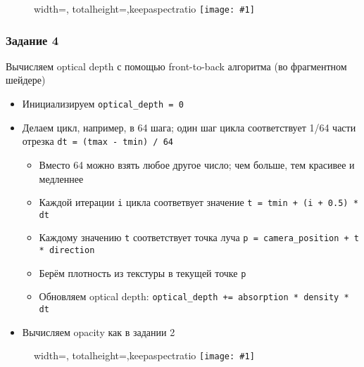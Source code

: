\documentclass{beamer}
\newcommand{\slideimage}[1]{
  \begin{figure}
    \begin{adjustbox}{width=\textwidth, totalheight=\textheight-2\baselineskip-2\baselineskip,keepaspectratio}
      \texttt{[image: \#1]}
    \end{adjustbox}
  \end{figure}
}
\begin{document}
\begin{frame}[fragile]
\slideimage{3.png}
\end{frame}

\begin{frame}[fragile]
\frametitle{Задание 4}
Вычисляем optical depth с помощью front-to-back алгоритма (во фрагментном шейдере)
\begin{itemize}
\item Инициализируем \verb|optical_depth = 0|
\item Делаем цикл, например, в 64 шага; один шаг цикла соответствует 1/64 части отрезка \verb|dt = (tmax - tmin) / 64|
\begin{itemize}
\item Вместо 64 можно взять любое другое число; чем больше, тем красивее и медленнее
\item Каждой итерации \verb|i| цикла соответвует значение \verb|t = tmin + (i + 0.5) * dt|
\item Каждому значению \verb|t| соответствует точка луча \verb|p = camera_position + t * direction|
\item Берём плотность из текстуры в текущей точке \verb|p|
\item Обновляем optical depth: \verb|optical_depth += absorption * density * dt|
\end{itemize}
\item Вычисляем opacity как в задании 2
\end{itemize}
\end{frame}

\begin{frame}[fragile]
\slideimage{4.png}
\end{frame}
\end{document}
